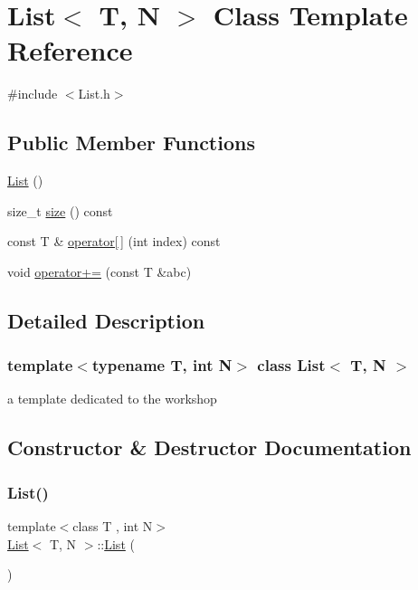 \hypertarget{class_list}{}\section{List$<$ T, N $>$ Class Template Reference}
\label{class_list}


{\ttfamily \#include $<$List.\+h$>$}

\subsection*{Public Member Functions}
\begin{DoxyCompactItemize}
\item 
\mbox{\hyperlink{class_list_ab11a34474cd717924277a0599b3b115b}{List}} ()
\item 
size\+\_\+t \mbox{\hyperlink{class_list_aeda8adf8979a5c0b772b320d2025d97c}{size}} () const
\item 
const T \& \mbox{\hyperlink{class_list_a12605d114dc1737f8bed98f382a7f0ae}{operator\mbox{[}$\,$\mbox{]}}} (int index) const
\item 
void \mbox{\hyperlink{class_list_aacf615b290fa4f7f751ac892c9010fcb}{operator+=}} (const T \&abc)
\end{DoxyCompactItemize}


\subsection{Detailed Description}
\subsubsection*{template$<$typename T, int N$>$\newline
class List$<$ T, N $>$}

a template dedicated to the workshop 

\subsection{Constructor \& Destructor Documentation}
\mbox{\label{class_list_ab11a34474cd717924277a0599b3b115b}} 
\subsubsection{\texorpdfstring{List()}{List()}}
{\footnotesize\ttfamily template$<$class T , int N$>$ \\
\mbox{\hyperlink{class_list}{List}}$<$ T, N $>$\+::\mbox{\hyperlink{class_list}{List}} (\begin{DoxyParamCaption}{ }\end{DoxyParamCaption})}

